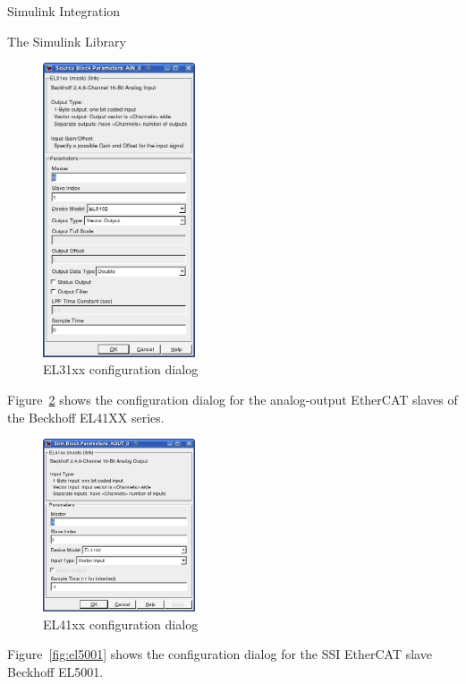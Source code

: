 \begin{ighsec}{Simulink Integration}
\begin{ighsec}{The Simulink Library}
\begin{figure}[H]
  \begin{center}
    \includegraphics[width=0.4\textwidth]{images/el31xx.png}
    \caption{EL31xx configuration dialog}
    \label{fig:el31xx}
  \end{center}
\end{figure}

Figure~\ref{fig:el41xx} shows the configuration dialog for the
analog-output EtherCAT slaves of the Beckhoff EL41XX series.

\begin{figure}[H]
  \begin{center}
    \includegraphics[width=0.4\textwidth]{images/el41xx.png}
    \caption{EL41xx configuration dialog}
    \label{fig:el41xx}
  \end{center}
\end{figure}

Figure~\ref{fig:el5001} shows the configuration dialog for the SSI
EtherCAT slave Beckhoff EL5001.


\end{ighsec}
\end{ighsec}
